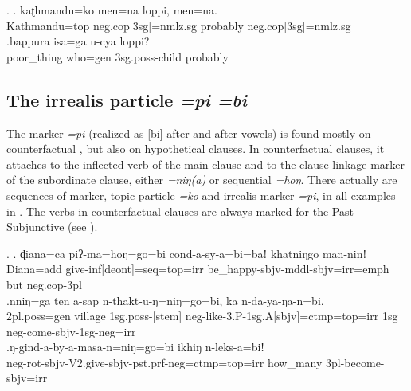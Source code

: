 \ex. \ag. kaʈhmandu=ko     men=na            loppi,  men=na.\\
Kathmandu{\sc =top} {\sc neg.cop[3sg]=nmlz.sg} probably  {\sc neg.cop[3sg]=nmlz.sg}\\
 
\bg.bappura  isa=ga    u-cya            loppi?\\
poor\_thing who{\sc =gen} {\sc 3sg.poss-}child probably\\
 


\subsection{The irrealis particle \emph{=pi \ti =bi}}

The marker \emph{=pi} (realized as [bi] after  and after vowels) is  found mostly on counterfactual , but also on hypothetical clauses. In counterfactual clauses, it attaches to the inflected verb of the main clause and to the clause linkage marker of the subordinate clause, either  \emph{=niŋ(a)} or sequential  \emph{=hoŋ}.  There  actually are sequences of  marker, topic particle \emph{=ko} and irrealis marker \emph{=pi}, in all examples in \Next. The verbs in counterfactual clauses are always marked for the Past Subjunctive (see ).
	
	\ex. \ag. ɖiana=ca  piʔ-ma=hoŋ=go=bi   cond-a-sy-a=bi=baǃ khatniŋgo man-ninǃ\\
	Diana{\sc =add} give{\sc -inf[deont]=seq=top=irr} be\_happy{\sc [3sg]-sbjv-mddl-sbjv=irr=emph} but {\sc neg.cop-3pl}\\
	\bg.nniŋ=ga ten a-sap n-thakt-u-ŋ=niŋ=go=bi, ka n-da-ya-ŋa-n=bi.\\
	{\sc 2pl.poss=gen} village {\sc 1sg.poss-[stem]} {\sc neg-}like{\sc -3.P-1sg.A[sbjv]=ctmp=top=irr} {\sc 1sg} {\sc neg-}come{\sc -sbjv-1sg-neg=irr}\\
	\bg.ŋ-gind-a-by-a-masa-n=niŋ=go=bi ikhiŋ n-leks-a=biǃ\\
	{\sc neg-}rot{\sc -sbjv-V2.give-sbjv-pst.prf-neg=ctmp=top=irr} how\_many {\sc 3pl-}become{\sc -sbjv=irr}\\
	 
